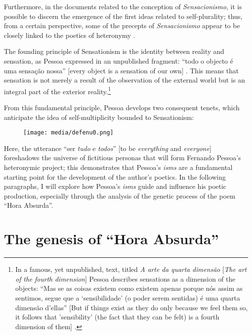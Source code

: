 \documentclass{article}
\begin{document}
Furthermore, in the documents related to the conception of
\emph{Sensacionismo}, it is possible to discern the emergence of the
first ideas related to self-plurality; thus, from a certain perspective,
some of the precepts of \emph{Sensacionismo} appear to be closely linked
to the poetics of heteronymy \parencite[9]{pessoa_sobre_2015}.

The founding principle of Sensationism is the identity between reality
and sensation, as Pessoa expressed in an unpublished fragment: ``todo o
objecto é uma sensação nossa'' [every object is a sensation of our
own] \parencite[145]{pessoa_sensacionismo_2009}. This means that sensation is not merely a
result of the observation of the external world but is an integral part
of the exterior reality.\footnote{In a famous, yet unpublished, text,
  titled \emph{A arte da quarta dimensão} [\emph{The art of the fourth
  dimension}] Pessoa describes sensations as a dimension of the
  objects: ``Mas se as coisas existem como existem apenas porque nós
  assim as sentimos, segue que a `sensibilidade' (o poder serem
  sentidas) é uma quarta dimensão d'ellas'' [But if things exist as
  they do only because we feel them so, it follows that 'sensibility'
  (the fact that they can be felt) is a fourth dimension of them]
  \parencite[148--149]{pessoa_sensacionismo_2009}.}

From this fundamental principle, Pessoa develops two consequent tenets,
which anticipate the idea of self-multiplicity bounded to Sensationism:

\begin{figure}
    \centering
    \texttt{[image: media/defenu0.png]}
    \caption{\parencite[149]{pessoa_sensacionismo_2009}}
    \label{fig:defenu0}
\end{figure}

\noindent Here, the utterance ``ser \emph{tudo} e \emph{todos}'' [to be \emph{everything} and \emph{everyone}] foreshadows the universe
of fictitious personas that will form Fernando Pessoa's heteronymic
project; this demonstrates that Pessoa's \emph{isms} are a fundamental
starting point for the development of the author's poetics. In the
following paragraphs, I will explore how Pessoa's \emph{isms} guide and
influence his poetic production, especially through the analysis of the
genetic process of the poem ``Hora Absurda''.

\section{The genesis of ``Hora Absurda''}
\end{document}
